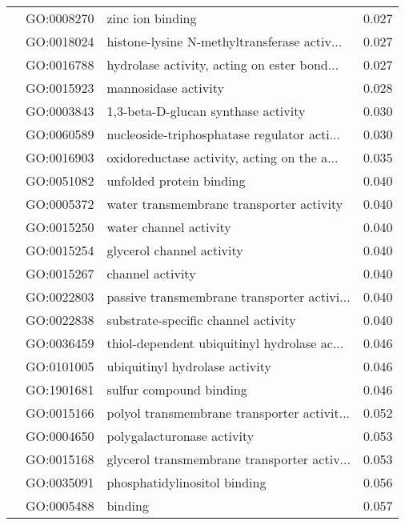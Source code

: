 \begin{longtable}{lllr}
   & GO:0008270 &                             zinc ion binding &         0.027 \\
   & GO:0018024 &  histone-lysine N-methyltransferase activ... &         0.027 \\
   & GO:0016788 &  hydrolase activity, acting on ester bond... &         0.027 \\
   & GO:0015923 &                         mannosidase activity &         0.028 \\
   & GO:0003843 &          1,3-beta-D-glucan synthase activity &         0.030 \\
   & GO:0060589 &  nucleoside-triphosphatase regulator acti... &         0.030 \\
   & GO:0016903 &  oxidoreductase activity, acting on the a... &         0.035 \\
   & GO:0051082 &                     unfolded protein binding &         0.040 \\
   & GO:0005372 &     water transmembrane transporter activity &         0.040 \\
   & GO:0015250 &                       water channel activity &         0.040 \\
   & GO:0015254 &                    glycerol channel activity &         0.040 \\
   & GO:0015267 &                             channel activity &         0.040 \\
   & GO:0022803 &  passive transmembrane transporter activi... &         0.040 \\
   & GO:0022838 &          substrate-specific channel activity &         0.040 \\
   & GO:0036459 &  thiol-dependent ubiquitinyl hydrolase ac... &         0.046 \\
   & GO:0101005 &               ubiquitinyl hydrolase activity &         0.046 \\
   & GO:1901681 &                      sulfur compound binding &         0.046 \\
   & GO:0015166 &  polyol transmembrane transporter activit... &         0.052 \\
   & GO:0004650 &                   polygalacturonase activity &         0.053 \\
   & GO:0015168 &  glycerol transmembrane transporter activ... &         0.053 \\
   & GO:0035091 &                 phosphatidylinositol binding &         0.056 \\
   & GO:0005488 &                                      binding &         0.057 \\

\end{longtable}
